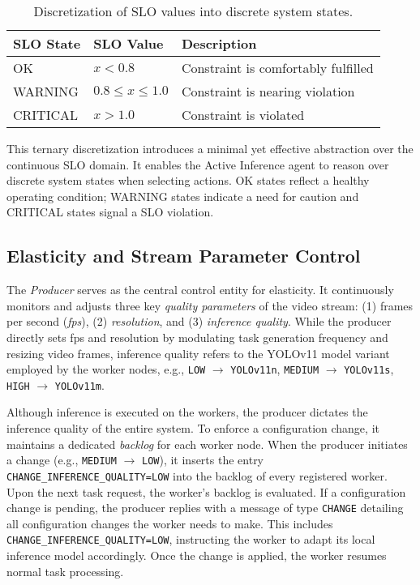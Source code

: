 \begin{table}[h]
    \centering
    \begin{tabular}{@{}lll@{}}
        \toprule
        \textbf{SLO State} & \textbf{SLO Value} & \textbf{Description} \\
        \midrule
        OK        & \( x < 0.8 \)                          & Constraint is comfortably fulfilled \\
        WARNING   & \( 0.8 \leq x \leq 1.0 \)             & Constraint is nearing violation     \\
        CRITICAL  & \( x > 1.0 \)                         & Constraint is violated              \\
        \bottomrule
    \end{tabular}
    \caption{Discretization of SLO values into discrete system states.}
    \label{tab:slo-states}
\end{table}


This ternary discretization introduces a minimal yet effective abstraction over the continuous SLO domain. It enables the Active Inference agent to reason over discrete system states when selecting actions. OK states reflect a healthy operating condition; WARNING states indicate a need for caution and CRITICAL states signal a SLO violation.


\subsection{Elasticity and Stream Parameter Control}
The \textit{Producer} serves as the central control entity for elasticity. It continuously monitors and adjusts three key \textit{quality parameters} of the video stream: (1) frames per second (\textit{fps}), (2) \textit{resolution}, and (3) \textit{inference quality}. While the producer directly sets fps and resolution by modulating task generation frequency and resizing video frames, inference quality refers to the YOLOv11 model variant employed by the worker nodes, e.g., \texttt{LOW} $\rightarrow$ \texttt{YOLOv11n}, \texttt{MEDIUM} $\rightarrow$ \texttt{YOLOv11s}, \texttt{HIGH} $\rightarrow$ \texttt{YOLOv11m}.

Although inference is executed on the workers, the producer dictates the inference quality of the entire system. To enforce a configuration change, it maintains a dedicated \textit{backlog} for each worker node. When the producer initiates a change (e.g., \texttt{MEDIUM} $\rightarrow$ \texttt{LOW}), it inserts the entry \texttt{CHANGE\_INFERENCE\_QUALITY=LOW} into the backlog of every registered worker. Upon the next task request, the worker's backlog is evaluated. If a configuration change is pending, the producer replies with a message of type \texttt{CHANGE} detailing all configuration changes the worker needs to make. This includes \texttt{CHANGE\_INFERENCE\_QUALITY=LOW}, instructing the worker to adapt its local inference model accordingly. Once the change is applied, the worker resumes normal task processing.

